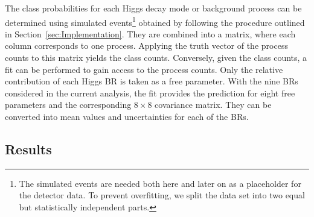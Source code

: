 \documentclass[a4paper,11pt]{article}
\begin{document}
The class probabilities for each Higgs decay mode or background process can
be determined using simulated events\footnote{
    The simulated events are needed both here and later on as a placeholder
    for the detector data.
    To prevent overfitting, we split the data set
    into two equal but statistically independent parts.
}
obtained by following the procedure outlined in Section~\ref{sec:Implementation}.
They are combined into a matrix, where each column corresponds to one process.
Applying the truth vector of the process counts to this matrix yields the class counts.
Conversely, given the class counts, a fit can be performed to gain access to the
process counts.
Only the relative contribution of each Higgs BR is taken as a free parameter.
With the nine BRs considered in the current analysis,
the fit provides the prediction for eight free parameters
and the corresponding $8 \times 8$ covariance matrix.
They can be converted into mean values and uncertainties for each of the BRs.

\subsection{Results}
\end{document}
